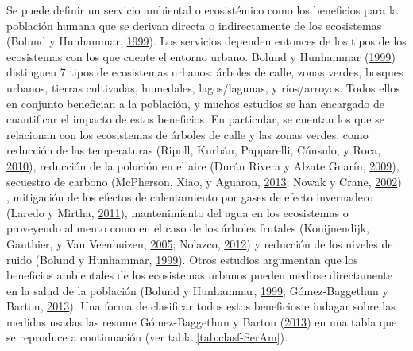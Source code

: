 \documentclass[12pt,a4paper,oneside, openany]{book}
\theoremstyle{definition}
\theoremstyle{definition}
\theoremstyle{definition}
\theoremstyle{remark}
\begin{document}
Se puede definir un servicio ambiental o ecosistémico como los
beneficios para la población humana que se derivan directa o
indirectamente de los ecosistemas (Bolund y Hunhammar,
\protect\hyperlink{ref-bolund_ecosystem_1999}{1999}). Los servicios
dependen entonces de los tipos de los ecosistemas con los que cuente el
entorno urbano. Bolund y Hunhammar
(\protect\hyperlink{ref-bolund_ecosystem_1999}{1999}) distinguen 7 tipos
de ecosistemas urbanos: árboles de calle, zonas verdes, bosques urbanos,
tierras cultivadas, humedales, lagos/lagunas, y ríos/arroyos. Todos
ellos en conjunto benefician a la población, y muchos estudios se han
encargado de cuantificar el impacto de estos beneficios. En particular,
se cuentan los que se relacionan con los ecosistemas de árboles de calle
y las zonas verdes, como reducción de las temperaturas (Ripoll, Kurbán,
Papparelli, Cúnsulo, y Roca,
\protect\hyperlink{ref-ripoll_condiciones_2010}{2010}), reducción de la
polución en el aire (Durán Rivera y Alzate Guarín,
\protect\hyperlink{ref-duran_rivera_intercepcion_2009}{2009}), secuestro
de carbono (McPherson, Xiao, y Aguaron,
\protect\hyperlink{ref-mcpherson2013new}{2013}; Nowak y Crane,
\protect\hyperlink{ref-nowak_carbon_2002}{2002}) , mitigación de los
efectos de calentamiento por gases de efecto invernadero (Laredo y
Mirtha, \protect\hyperlink{ref-laredo_gestion_2011}{2011}),
mantenimiento del agua en los ecosistemas o proveyendo alimento como en
el caso de los árboles frutales (Konijnendijk, Gauthier, y Van
Veenhuizen, \protect\hyperlink{ref-konijnendijk_arboles_2005}{2005};
Nolazco, \protect\hyperlink{ref-nolazco_diversidad_2012}{2012}) y
reducción de los niveles de ruido (Bolund y Hunhammar,
\protect\hyperlink{ref-bolund_ecosystem_1999}{1999}). Otros estudios
argumentan que los beneficios ambientales de los ecosistemas urbanos
pueden medirse directamente en la salud de la población (Bolund y
Hunhammar, \protect\hyperlink{ref-bolund_ecosystem_1999}{1999};
Gómez-Baggethun y Barton,
\protect\hyperlink{ref-gomez-baggethun_classifying_2013}{2013}). Una
forma de clasificar todos estos beneficios e indagar sobre las medidas
usadas las resume Gómez-Baggethun y Barton
(\protect\hyperlink{ref-gomez-baggethun_classifying_2013}{2013}) en una
tabla que se reproduce a continuación (ver tabla \ref{tab:clasf-SerAm}).
\end{document}
